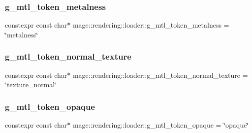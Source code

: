 \hypertarget{namespacemage_1_1rendering_1_1loader_ac4f0b29e02f570fbb9ab2338f2074eb2}{}\label{namespacemage_1_1rendering_1_1loader_ac4f0b29e02f570fbb9ab2338f2074eb2} 
\subsubsection{\texorpdfstring{g\+\_\+mtl\+\_\+token\+\_\+metalness}{g\_mtl\_token\_metalness}}
{\footnotesize\ttfamily constexpr const char$\ast$ mage\+::rendering\+::loader\+::g\+\_\+mtl\+\_\+token\+\_\+metalness = \char`\"{}metalness\char`\"{}}

\hypertarget{namespacemage_1_1rendering_1_1loader_a13971b37d2f56dd9b4988fd85a176693}{}\label{namespacemage_1_1rendering_1_1loader_a13971b37d2f56dd9b4988fd85a176693} 
\subsubsection{\texorpdfstring{g\+\_\+mtl\+\_\+token\+\_\+normal\+\_\+texture}{g\_mtl\_token\_normal\_texture}}
{\footnotesize\ttfamily constexpr const char$\ast$ mage\+::rendering\+::loader\+::g\+\_\+mtl\+\_\+token\+\_\+normal\+\_\+texture = \char`\"{}texture\+\_\+normal\char`\"{}}

\hypertarget{namespacemage_1_1rendering_1_1loader_a66314df61f846ec6712927df2583a6d9}{}\label{namespacemage_1_1rendering_1_1loader_a66314df61f846ec6712927df2583a6d9} 
\subsubsection{\texorpdfstring{g\+\_\+mtl\+\_\+token\+\_\+opaque}{g\_mtl\_token\_opaque}}
{\footnotesize\ttfamily constexpr const char$\ast$ mage\+::rendering\+::loader\+::g\+\_\+mtl\+\_\+token\+\_\+opaque = \char`\"{}opaque\char`\"{}}

